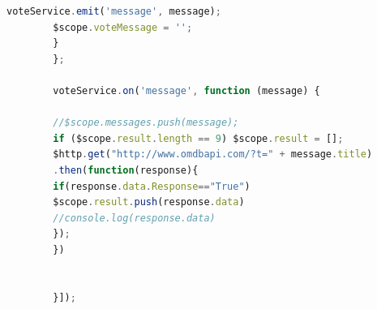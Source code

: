 \documentclass[11pt]{article}
\begin{document}
\begin{appendices}
\begin{lstlisting}[language=Javascript, caption=controllers/vote.js]
		voteService.emit('message', message);
		$scope.voteMessage = '';
		}
		};
		
		voteService.on('message', function (message) {
		
		//$scope.messages.push(message);
		if ($scope.result.length == 9) $scope.result = [];
		$http.get("http://www.omdbapi.com/?t=" + message.title)
		.then(function(response){   
		if(response.data.Response=="True")                              
		$scope.result.push(response.data)
		//console.log(response.data) 
		});
		})
		
		
		}]);
	\end{lstlisting}
\end{appendices}
\end{document}
